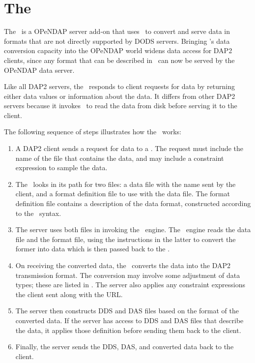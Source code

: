 

%
%
%
%
%
%

\chapter{The \ffs}
\label{ff,ff-server}

The \ffs\ is a OPeNDAP server add-on that uses \ffnd\ to convert and serve data
in formats that are not directly supported by DODS servers.  Bringing
\ffnd 's data conversion capacity into the OPeNDAP world widens data
access for DAP2 clients, since any format that can be described in
\ffnd\ can now be served by the OPeNDAP data server.

Like all DAP2 servers, the \ffs\ responds to client requests for data
by returning either data values or information about the data.  It
differs from other DAP2 servers because it invokes \ffnd\ to read the
data from disk before serving it to the client.

The following sequence of steps illustrates how the \ffs\ works:

\begin{enumerate}
\item A DAP2 client sends a request for data to a \ffs .  The request
  must include the name of the file that contains the data, and may
  include a constraint expression to sample the data.
\item The \ffs\ looks in its path for two files: a data file with the
  name sent by the client, and a format definition file to use with
  the data file.  The format definition file contains a description of
  the data format, constructed according to the \ffnd\ syntax.
\item The server uses both files in invoking the \ffnd\ engine.  The
  \ffnd\ engine reads the data file and the format file, using the
  instructions in the latter to convert the former into data which is
  then passed back to the \ffs .
\item On receiving the converted data, the \ffs\ converts the data
  into the DAP2 transmission format.  The conversion may involve some
  adjustment of data types; these are listed in
  .  The server also applies any constraint
  expressions the client sent along with the URL.
\item The server then constructs DDS and DAS files based on the format
  of the converted data.  If the server has access to DDS and DAS
  files that describe the data, it applies those definition before
  sending them back to the client.
\item Finally, the server sends the DDS, DAS, and converted data back
  to the client.
\end{enumerate}

